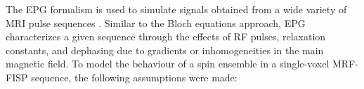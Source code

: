The EPG formalism \cite{Hennig1988} \cite{Hennig1991} \cite{Weigel2015} is used to simulate signals obtained from a wide variety of MRI pulse sequences \cite{Malik2017}.
Similar to the Bloch equations approach, EPG characterizes a given sequence through the effects of RF pulses, relaxation constants, and dephasing due to gradients or inhomogeneities in the main magnetic field.
To model the behaviour of a spin ensemble 
in a single-voxel MRF-FISP sequence, the following assumptions were made:



